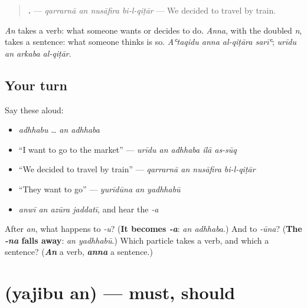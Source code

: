 \begin{grammarlens}[title={Grammar Lens: an and anna}]
\begin{quote}
\textbf{   .} — \emph{qarrarnā an nusāfira bi-l-qiṭār} — We decided to travel by train.
\end{quote}

\emph{An} takes a verb: what someone wants or decides to do. \emph{Anna}, with the doubled \emph{n}, takes a sentence: what someone thinks is so. \emph{Aʿtaqidu anna al-qiṭāra sarīʿ}; \emph{urīdu an arkaba al-qiṭār}.
\end{grammarlens}

\subsection*{Your turn}
Say these aloud:

\begin{itemize}
\raggedright
  \item \emph{adhhabu} … \emph{an adhhaba}
  \item \textquotedblleft{}I want to go to the market\textquotedblright{} — \emph{urīdu an adhhaba ilā as-sūq}
  \item \textquotedblleft{}We decided to travel by train\textquotedblright{} — \emph{qarrarnā an nusāfira bi-l-qiṭār}
  \item \textquotedblleft{}They want to go\textquotedblright{} — \emph{yurīdūna an yadhhabū}
  \item \emph{anwī an azūra jaddatī}, and hear the \emph{-a}
\end{itemize}

\begin{tcolorbox}[breakable,colback=teal!4,colframe=teal!35!black,title={Before you move on}]
After \emph{an}, what happens to \emph{-u}? (\textbf{It becomes \emph{-a}}: \emph{an adhhaba}.) And to \emph{-ūna}? (\textbf{The \emph{-na} falls away}: \emph{an yadhhabū}.) Which particle takes a verb, and which a sentence? (\emph{\textbf{An}} a verb, \emph{\textbf{anna}} a sentence.)
\end{tcolorbox}
\section[\texorpdfstring{\ar{يجب} \ar{أن} (yajibu an)}{يجب أن (yajibu an)}]{  (yajibu an) — must, should}

\label{lesson:AR-C286-yajibu-an}



